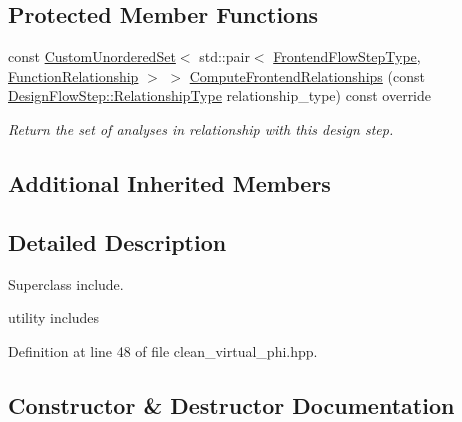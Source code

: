 \subsection*{Protected Member Functions}
\begin{DoxyCompactItemize}
\item 
const \hyperlink{classCustomUnorderedSet}{Custom\+Unordered\+Set}$<$ std\+::pair$<$ \hyperlink{frontend__flow__step_8hpp_afeb3716c693d2b2e4ed3e6d04c3b63bb}{Frontend\+Flow\+Step\+Type}, \hyperlink{classFrontendFlowStep_af7cf30f2023e5b99e637dc2058289ab0}{Function\+Relationship} $>$ $>$ \hyperlink{classCleanVirtualPhi_a2ea73b631ec054156c04d2da95c66f8e}{Compute\+Frontend\+Relationships} (const \hyperlink{classDesignFlowStep_a723a3baf19ff2ceb77bc13e099d0b1b7}{Design\+Flow\+Step\+::\+Relationship\+Type} relationship\+\_\+type) const override
\begin{DoxyCompactList}\small\item\em Return the set of analyses in relationship with this design step. \end{DoxyCompactList}\end{DoxyCompactItemize}
\subsection*{Additional Inherited Members}


\subsection{Detailed Description}
Superclass include. 

utility includes 

Definition at line 48 of file clean\+\_\+virtual\+\_\+phi.\+hpp.



\subsection{Constructor \& Destructor Documentation}
\mbox{\label{classCleanVirtualPhi_a472074d8b1ac84804cf1d8c727f2ff65}} 
